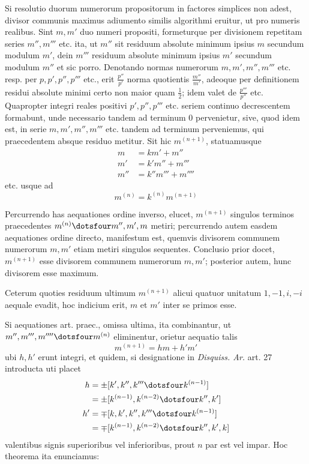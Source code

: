 Si resolutio duorum numerorum propositorum in factores simplices non adest, divisor communis maximus adiumento similis algorithmi eruitur, ut pro numeris realibus. Sint $m,m'$ duo numeri propositi, formeturque per divisionem repetitam series $m'',m'''$ etc. ita, ut $m''$ sit residuum absolute minimum ipsius $m$ secundum modulum $m'$, dein $m'''$ residuum absolute minimum ipsius $m'$ secundum modulum $m''$ et sic porro. Denotando normas numerorum $m,m',m'',m'''$ etc. resp. per $p,p',p'',p'''$ etc., erit $\frac{p''}{p'}$ norma quotientis $\frac{m''}{m'}$, adeoque per definitionem residui absolute minimi certo non maior quam $\frac12$; idem valet de $\frac{p'''}{p''}$ etc. Quapropter integri reales positivi $p',p'',p'''$ etc. seriem continuo decrescentem formabunt, unde necessario tandem ad terminum $0$ pervenietur, sive, quod idem est, in serie $m,m',m'',m'''$ etc. tandem ad terminum perveniemus, qui praecedentem absque residuo metitur. Sit hic $m^{(n+1)}$, statuamusque
\[
\begin{aligned}
m&=km'+m''\\
m'&=k'm''+m'''\\
m''&=k''m'''+m''''
\end{aligned}
\]
etc. usque ad
\[
m^{(n)}=k^{(n)}m^{(n+1)}
\]

Percurrendo has aequationes ordine inverso, elucet, $m^{(n+1)}$ singulos terminos praecedentes $m^{(n)}\dotsfour m'',m',m$ metiri; percurrendo autem easdem aequationes ordine directo, manifestum est, quemvis divisorem communem numerorum $m,m'$ etiam metiri singulos sequentes. Conclusio prior docet, $m^{(n+1)}$ esse divisorem communem numerorum $m,m'$; posterior autem, hunc divisorem esse maximum.

Ceterum quoties residuum ultimum $m^{(n+1)}$ alicui quatuor unitatum $1,-1,i,-i$ aequale evadit, hoc indicium erit, $m$ et $m'$ inter se primos esse.

Si aequationes art. praec., omissa ultima, ita combinantur, ut $m'',\allowbreak m''',\allowbreak m''''\dotsfour\allowbreak m^{(n)}$ eliminentur, orietur aequatio talis
\[
m^{(n+1)}=hm+h'm'
\]
%
ubi $h,h'$ erunt integri, et quidem, si designatione in \emph{Disquiss. Ar.} art. 27 introducta uti placet
\[
\begin{aligned}
h&=\pm[k',k'',k'''\dotsfour k^{(n-1)}]\\
&=\pm[k^{(n-1)},k^{(n-2)}\dotsfour k'',k']\\
h'&=\mp[k,k',k'',k'''\dotsfour k^{(n-1)}]\\
&=\mp[k^{(n-1)},k^{(n-2)}\dotsfour k'',k',k]
\end{aligned}
\]
valentibus signis superioribus vel inferioribus, prout $n$ par est vel impar. Hoc theorema ita enunciamus:

